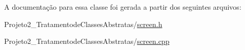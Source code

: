 A documentação para essa classe foi gerada a partir dos seguintes arquivos\+:\begin{DoxyCompactItemize}
\item 
Projeto2\+\_\+\+Tratamentode\+Classes\+Abstratas/\mbox{\hyperlink{screen_8h}{screen.\+h}}\item 
Projeto2\+\_\+\+Tratamentode\+Classes\+Abstratas/\mbox{\hyperlink{screen_8cpp}{screen.\+cpp}}\end{DoxyCompactItemize}
